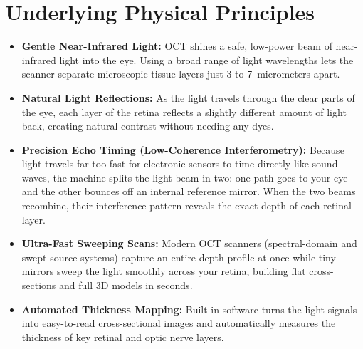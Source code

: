 \section{Underlying Physical Principles}
\begin{itemize}
\item \textbf{Gentle Near-Infrared Light:} OCT shines a safe, low-power beam of near-infrared light into the eye. Using a broad range of light wavelengths lets the scanner separate microscopic tissue layers just 3 to 7~micrometers apart.
\item \textbf{Natural Light Reflections:} As the light travels through the clear parts of the eye, each layer of the retina reflects a slightly different amount of light back, creating natural contrast without needing any dyes.
\item \textbf{Precision Echo Timing (Low-Coherence Interferometry):} Because light travels far too fast for electronic sensors to time directly like sound waves, the machine splits the light beam in two: one path goes to your eye and the other bounces off an internal reference mirror. When the two beams recombine, their interference pattern reveals the exact depth of each retinal layer.
\item \textbf{Ultra-Fast Sweeping Scans:} Modern OCT scanners (spectral-domain and swept-source systems) capture an entire depth profile at once while tiny mirrors sweep the light smoothly across your retina, building flat cross-sections and full 3D models in seconds.
\item \textbf{Automated Thickness Mapping:} Built-in software turns the light signals into easy-to-read cross-sectional images and automatically measures the thickness of key retinal and optic nerve layers.
\end{itemize}

